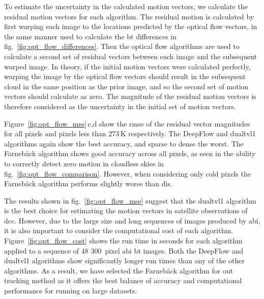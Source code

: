 To estimate the uncertainty in the calculated motion vectors, we calculate the residual motion vectors for each algorithm.
The residual motion is calculated by first warping each image to the locations predicted by the optical flow vectors, in the same manner used to calculate the \acrshort{bt} differences in fig.~\ref{fig:opt_flow_differences}.
Then the optical flow algorithms are used to calculate a second set of residual vectors between each image and the subsequent warped image.
In theory, if the initial motion vectors were calculated perfectly, warping the image by the optical flow vectors should result in the subsequent cloud in the same position as the prior image, and so the second set of motion vectors should calculate as zero.
The magnitude of the residual motion vectors is therefore considered as the uncertainty in the initial set of motion vectors.

Figure~\ref{fig:opt_flow_mse}\,c,d show the \acrshort{rmse} of the residual vector magnitudes for all pixels and pixels less than 273\,\unit{K} respectively.
The DeepFlow and \acrshort{dualtvl1} algorithms again show the best accuracy, and sparse to dense the worst.
The Farnebäck algorithm shows good accuracy across all pixels, as seen in the ability to correctly detect zero motion in cloudless skies in fig.~\ref{fig:opt_flow_comparison}.
However, when considering only cold pixels the Farnebäck algorithm performs slightly worse than \acrshort{dis}.

The results shown in fig.~\ref{fig:opt_flow_mse} suggest that the \acrshort{dualtvl1} algorithm is the best choice for estimating the motion vectors in satellite observations of \acrshort{dcc}.
However, due to the large size and long sequences of images produced by \acrshort{abi}, it is also important to consider the computational cost of each algorithm.
Figure~\ref{fig:opt_flow_cost} shows the run time in seconds for each algorithm applied to a sequence of 48 300~pixel \acrshort{abi} \acrshort{bt} images.
Both the DeepFlow and \acrshort{dualtvl1} algorithms show significantly longer run times than any of the other algorithms.
As a result, we have selected the Farnebäck algorithm for out tracking method as it offers the best balance of accuracy and computational performance for running on large datasets.


